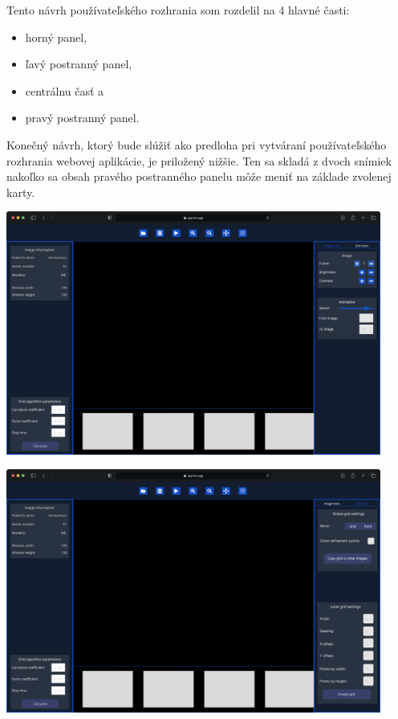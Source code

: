 Tento návrh používateľského rozhrania som rozdelil na 4 hlavné časti:
\begin {itemize}
\item {horný panel,}
\item {ľavý postranný panel,}
\item {centrálnu časť a}
\item {pravý postranný panel.}
\end {itemize}

Konečný návrh, ktorý bude slúžiť ako predloha pri vytváraní používateľského rozhrania webovej aplikácie, je priložený nižšie. Ten sa skladá z dvoch snímiek nakoľko sa obsah pravého postranného panelu môže meniť na základe zvolenej karty.

\begin {center}
\centering
\includegraphics[height=8cm]{media/wireframes/1.png}
\captionsetup{justification=centering}
\end {center}

\begin {center}
\centering
\includegraphics[height=8cm]{media/wireframes/2.png}
\captionsetup{justification=centering}
\end {center}

